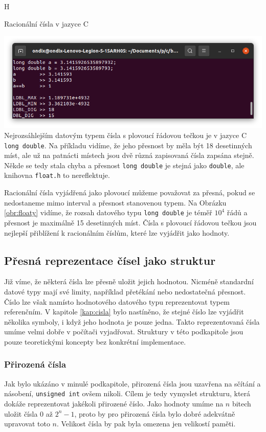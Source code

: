 \begin{myfigure}{H}
\caption{Racionální čísla v jazyce C}
\includegraphics[width=\linewidth]{./graphics/floaty.png}\label{obr:floaty}
Nejrozsáhlejším datovým typem čísla s plovoucí řádovou tečkou je v jazyce C \texttt{long double}. Na příkladu vidíme, že jeho přesnost by měla být 18 desetinných míst, ale už na patnácti místech jsou dvě různá zapisovaná čísla zapsána stejně. Někde se tedy stala chyba a přesnost \texttt{long double} je stejná jako \texttt{double}, ale knihovna \texttt{float.h} to nereflektuje.
\end{myfigure}

Racionální čísla vyjádřená jako plovoucí můžeme považovat za přesná, pokud se nedostaneme mimo interval a přesnost stanovenou typem. Na Obrázku \ref{obr:floaty} vidíme, že rozsah datového typu \texttt{long double} je téměř $10^4$ řádů a přesnost je maximálně 15 desetinných míst. Čísla s plovoucí řádovou tečkou jsou nejlepší přiblížení k racionálním číslům, které lze vyjádřit jako hodnoty.

\subsection{Přesná reprezentace čísel jako struktur}
Již víme, že některá čísla lze přesně uložit jejich hodnotou. Nicméně standardní datové typy mají své limity, například přetékání nebo nedostatečná přesnost. Číslo lze však namísto hodnotového datového typu reprezentovat typem referenčním. V kapitole \ref{kap:cisla} bylo nastíněno, že stejné číslo lze vyjádřit několika symboly, i když jeho hodnota je pouze jedna. Takto reprezentovaná čísla umíme velmi dobře v počítači vyjadřovat. Struktury v této podkapitole jsou pouze teoretickými koncepty bez konkrétní implementace.

\subsubsection{Přirozená čísla}
Jak bylo ukázáno v minulé podkapitole, přirozená čísla jsou uzavřena na sčítání a násobení, \texttt{unsigned int} ovšem nikoli. Cílem je tedy vymyslet strukturu, která dokáže reprezentovat jakékoli přirozené číslo. Jako hodnoty umíme na $n$ bitech uložit čísla $0$ až $2^n-1$, proto by pro přirozená čísla bylo dobré adekvátně upravovat toto $n$. Velikost čísla by pak byla omezena jen velikostí paměti.


